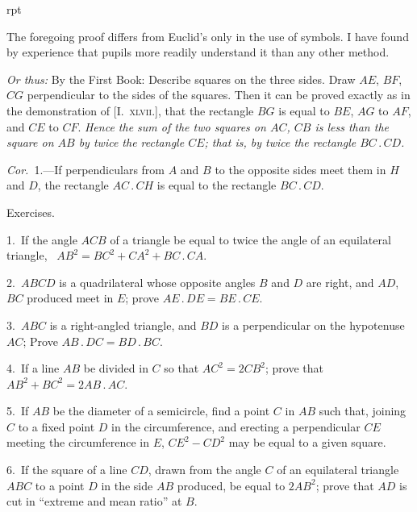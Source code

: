 \documentclass[oneside]{book}
\newcommand\exhead[1]{
\Needspace*{5\baselineskip}\begin{center}
\textsf{#1}
\end{center}
}
\newcommand\imgflow[3]{
\setcounter{wrapwidth}{#1}
\begin{wrapfigure}[#2]{r}{\value{wrapwidth}pt}
\begin{center}
\vspace{-0.3in}
\end{center}
\end{wrapfigure}
}
\begin{document}
\imgflow{145}{16}{f096}

\begin{footnotesize}
The foregoing proof differs from Euclid's only in the use of
symbols. I have found by experience that pupils more readily
understand it than any other method.\par\medskip

\textit{Or thus:} By the First Book:
Describe squares on the three
sides. Draw $AE$, $BF$, $CG$ perpendicular
to the sides of the
squares. Then it can be proved
exactly as in the demonstration
of [I.~\textsc{xlvii}.], that the rectangle
$BG$ is equal to $BE$, $AG$ to $AF$,
and $CE$ to $CF$. \textit{Hence the sum
of the two squares on $AC$, $CB$ is
less than the square on $AB$ by
twice the rectangle $CE$; that is,
by twice the rectangle $BC\,.\,CD$.}

\textit{Cor.}~1.---If perpendiculars
from $A$ and $B$ to the opposite
sides meet them in $H$ and $D$,
the rectangle $AC\,.\,CH$ is equal
to the rectangle $BC\,.\,CD$.
\par\end{footnotesize}


\exhead{Exercises.}

\begin{footnotesize}
1.~If the angle $ACB$ of a triangle be equal to twice the angle
of an equilateral triangle, \ $AB^{2} = BC^{2} + CA^{2} + BC\,.\,CA$.

2.~$ABCD$ is a quadrilateral whose opposite angles $B$ and $D$ are
right, and $AD$, $BC$ produced meet in $E$; prove $AE\,.\,DE = BE\,.\,CE$.

3.~$ABC$ is a right-angled triangle, and $BD$ is a perpendicular
on the hypotenuse $AC$; Prove $AB\,.\,DC = BD\,.\,BC$.

4.~If a line $AB$ be divided in $C$ so that $AC^{2} = 2CB^{2}$; prove that
$AB^{2} + BC^{2} = 2AB\,.\,AC$.

5.~If $AB$ be the diameter of a semicircle, find a point $C$ in $AB$
such that, joining $C$ to a fixed point $D$ in the circumference, and
erecting a perpendicular $CE$ meeting the circumference in $E$,
$CE^{2} - CD^{2}$ may be equal to a given square.

6.~If the square of a line $CD$, drawn from the angle $C$ of an
equilateral triangle $ABC$ to a point $D$ in the side $AB$ produced,
be equal to $2AB^{2}$; prove that $AD$ is cut in ``extreme and mean
ratio'' at $B$.
\par\end{footnotesize}
\end{document}

